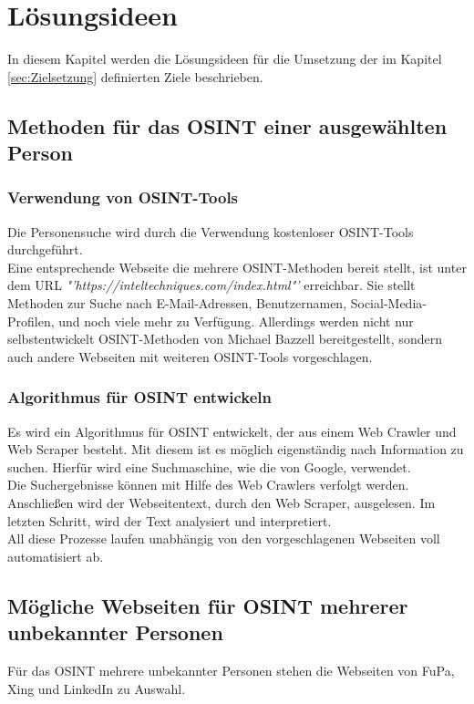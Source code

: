 
\chapter{Lösungsideen}  %
\label{cha:Lösungsideen} %
In diesem Kapitel werden die Lösungsideen für die Umsetzung der im Kapitel \ref{sec:Zielsetzung} definierten Ziele beschrieben.

\section{Methoden für das OSINT einer ausgewählten Person}
	\subsection{Verwendung von OSINT-Tools}
	Die Personensuche wird durch die Verwendung kostenloser OSINT-Tools durchgeführt.\\ 
	Eine entsprechende Webseite die mehrere OSINT-Methoden bereit stellt, ist unter dem URL \textit{"'https://inteltechniques.com/index.html"'} erreichbar. Sie stellt Methoden zur Suche nach E-Mail-Adressen, Benutzernamen, Social-Media-Profilen, und noch viele mehr zu Verfügung. Allerdings werden nicht nur selbstentwickelt OSINT-Methoden von Michael Bazzell bereitgestellt, sondern auch andere Webseiten mit weiteren OSINT-Tools vorgeschlagen.
	
	\subsection{Algorithmus für OSINT entwickeln}
	Es wird ein Algorithmus für OSINT entwickelt, der aus einem Web Crawler und Web Scraper besteht. Mit diesem ist es möglich eigenständig nach Information zu suchen. Hierfür wird eine Suchmaschine, wie die von Google, verwendet.\\
	Die Suchergebnisse können mit Hilfe des Web Crawlers verfolgt werden. Anschließen wird der Webseitentext, durch den Web Scraper, ausgelesen. Im letzten Schritt, wird der Text analysiert und interpretiert.\\
	All diese Prozesse laufen unabhängig von den vorgeschlagenen Webseiten voll automatisiert ab.


\section{Mögliche Webseiten für OSINT mehrerer unbekannter Personen}
Für das OSINT mehrere unbekannter Personen stehen die Webseiten von FuPa, Xing und LinkedIn zu Auswahl.
